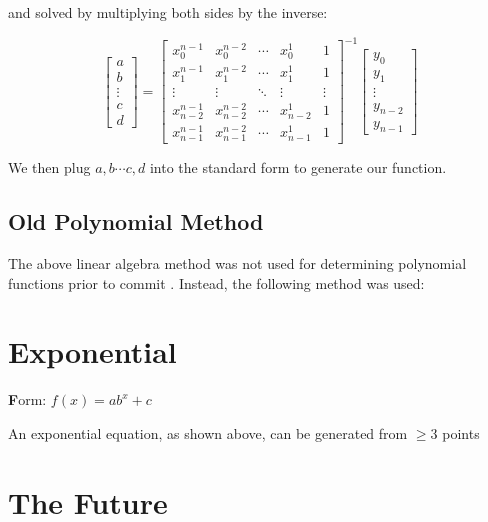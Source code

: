\documentclass[12pt, letterpaper]{article}
\begin{document}
and solved by multiplying both sides by the inverse:

\[
    \begin{bmatrix}
    a \\
    b \\
    \vdots \\
    c \\
    d
    \end{bmatrix}
    =
    \begin{bmatrix} 
    x_0^{n-1} & x_0^{n-2} & \cdots & x_0^1 & 1 \\
    x_1^{n-1} & x_1^{n-2} & \cdots & x_1^1 & 1 \\
    \vdots & \vdots & \ddots & \vdots & \vdots \\
    x_{n-2}^{n-1} & x_{n-2}^{n-2} & \cdots & x_{n-2}^1 & 1 \\
    x_{n-1}^{n-1} & x_{n-1}^{n-2} & \cdots & x_{n-1}^1 & 1
    \end{bmatrix}^{-1}
    \begin{bmatrix}
    y_0 \\
    y_1 \\
    \vdots \\
    y_{n-2} \\
    y_{n-1}
    \end{bmatrix}
\]

We then plug \(a, b \cdots c, d\) into the standard form to generate 
our function.

\subsection{Old Polynomial Method}

The above linear algebra method was not used for determining polynomial
functions prior to commit . Instead, the following method was used:

\section{Exponential}
{\textbf Form:} \(f(x)=ab^x+c\) \vspace{2ex}

An exponential equation, as shown above, can be generated from 
$\geq 3$ points


\section{The Future}
\end{document}
